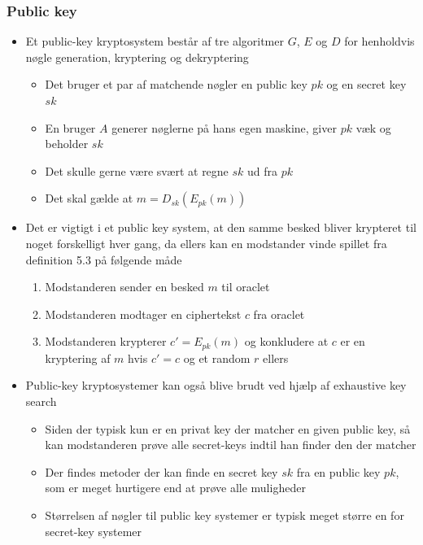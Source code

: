 \documentclass[a4, english]{article}
\begin{document}
\subsubsection{Public key}
\begin{itemize}
  \item Et public-key kryptosystem består af tre algoritmer $G$, $E$ og $D$ for henholdvis nøgle generation, kryptering og dekryptering
  \begin{itemize}
  	\item Det bruger et par af matchende nøgler en public key $pk$ og en secret key $sk$ 
    \item En bruger $A$ generer nøglerne på hans egen maskine, giver $pk$ væk og beholder $sk$ 
    \item Det skulle gerne være svært at regne $sk$ ud fra $pk$ 
    \item Det skal gælde at $m = D_{sk}(E_{pk}(m))$ 
  \end{itemize}
  \item Det er vigtigt i et public key system, at den samme besked bliver krypteret til noget forskelligt hver gang, da ellers kan en modstander vinde spillet fra definition 5.3 på følgende måde
  \begin{enumerate}
    \item Modstanderen sender en besked $m$ til oraclet
    \item Modstanderen modtager en ciphertekst $c$ fra oraclet
    \item Modstanderen krypterer $c'=E_{pk}(m)$ og konkludere at $c$ er en kryptering af $m$ hvis $c'=c$ og et random $r$ ellers
  \end{enumerate}
  \item Public-key kryptosystemer kan også blive brudt ved hjælp af exhaustive key search 
  \begin{itemize}
  	\item Siden der typisk kun er en privat key der matcher en given public key, så kan modstanderen prøve alle secret-keys indtil han finder den der matcher
    \item Der findes metoder der kan finde en secret key $sk$ fra en public key $pk$, som er meget hurtigere end at prøve alle muligheder
    \item Størrelsen af nøgler til public key systemer er typisk meget større en for secret-key systemer 
  \end{itemize}
\end{itemize}
\end{document}
